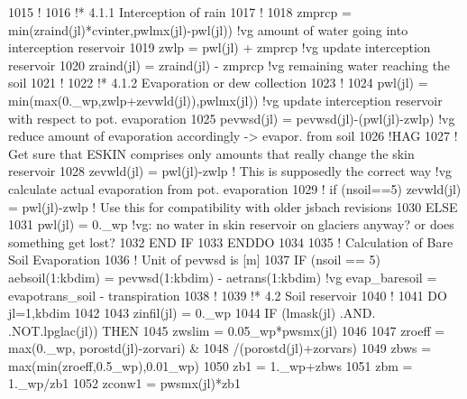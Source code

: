 \begin{DoxyCode}
1015 \textcolor{comment}{!}
1016 \textcolor{comment}{!*      4.1.1  Interception of rain}
1017 \textcolor{comment}{!}
1018         zmprcp     = min(zraind(jl)*cvinter,pwlmx(jl)-pwl(jl))  \textcolor{comment}{!vg  amount of water going into
       interception reservoir}
1019         zwlp       = pwl(jl)    + zmprcp                        \textcolor{comment}{!vg  update interception reservoir}
1020         zraind(jl) = zraind(jl) - zmprcp                        \textcolor{comment}{!vg  remaining water reaching the soil }
1021 \textcolor{comment}{!}
1022 \textcolor{comment}{!*      4.1.2  Evaporation or dew collection}
1023 \textcolor{comment}{!}
1024         pwl(jl)    = min(max(0.\_wp,zwlp+zevwld(jl)),pwlmx(jl))  \textcolor{comment}{!vg  update interception reservoir with
       respect to pot. evaporation}
1025         pevwsd(jl) = pevwsd(jl)-(pwl(jl)-zwlp)                  \textcolor{comment}{!vg  reduce amount of evaporation
       accordingly -> evapor. from soil}
1026 \textcolor{comment}{!HAG}
1027 \textcolor{comment}{!       Get sure that ESKIN comprises only amounts that really change the skin reservoir}
1028         zevwld(jl) = pwl(jl)-zwlp \textcolor{comment}{! This is supposedly the correct way     !vg  calculate actual
       evaporation from pot. evaporation}
1029 \textcolor{comment}{!        if (nsoil==5) zevwld(jl) = pwl(jl)-zwlp ! Use this for compatibility with older jsbach revisions}
1030       \textcolor{keywordflow}{ELSE}
1031         pwl(jl) = 0.\_wp   \textcolor{comment}{!vg: no water in skin reservoir on glaciers anyway? or does something get lost?}
1032 \textcolor{keywordflow}{      END IF}
1033 \textcolor{keywordflow}{    ENDDO}
1034 
1035 \textcolor{comment}{!   Calculation of Bare Soil Evaporation}
1036 \textcolor{comment}{!   Unit of pevwsd is [m]}
1037     \textcolor{keywordflow}{IF} (nsoil == 5) aebsoil(1:kbdim) = pevwsd(1:kbdim) - aetrans(1:kbdim)  \textcolor{comment}{!vg  evap\_baresoil =
       evapotrans\_soil - transpiration}
1038 \textcolor{comment}{!}
1039 \textcolor{comment}{!*  4.2    Soil reservoir}
1040 \textcolor{comment}{!}
1041     \textcolor{keywordflow}{DO} jl=1,kbdim
1042 
1043       zinfil(jl) = 0.\_wp
1044       \textcolor{keywordflow}{IF} (lmask(jl) .AND. .NOT.lpglac(jl)) \textcolor{keywordflow}{THEN}
1045         zwslim = 0.05\_wp*pwsmx(jl)
1046 
1047         zroeff = max(0.\_wp, porostd(jl)-zorvari)   &
1048                      /(porostd(jl)+zorvars)
1049         zbws   = max(min(zroeff,0.5\_wp),0.01\_wp)
1050         zb1    = 1.\_wp+zbws
1051         zbm    = 1.\_wp/zb1
1052         zconw1 = pwsmx(jl)*zb1

\end{DoxyCode}
